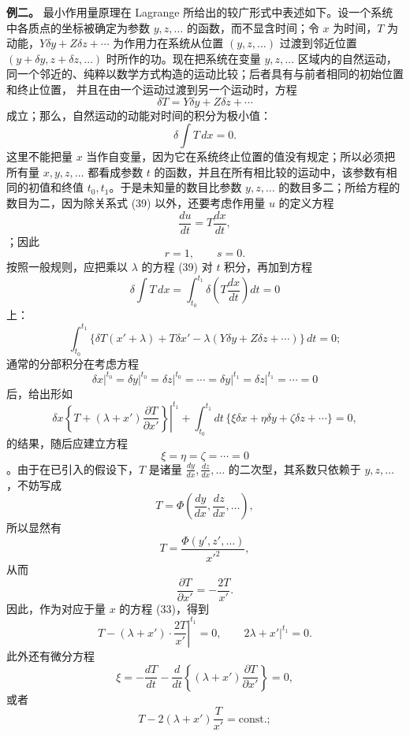 \documentclass[11pt,a4paper,leqno]{article}
\begin{document}
\noindent\textbf{例二。} 最小作用量原理在 Lagrange 所给出的较广形式中表述如下。设一个系统中各质点的坐标被确定为参数 $y,z,\ldots$ 的函数，而不显含时间；令 $x$ 为时间，$T$ 为动能，$Y\delta y+Z\delta z+\cdots$ 为作用力在系统从位置 $(y,z,\ldots)$ 过渡到邻近位置 $(y+\delta y,z+\delta z,\ldots)$ 时所作的功。现在把系统在变量 $y,z,\ldots$ 区域内的自然运动，同一个邻近的、纯粹以数学方式构造的运动比较；后者具有与前者相同的初始位置和终止位置，
并且在由一个运动过渡到另一个运动时，方程
\begin{equation}\tag{39}
\delta T=Y\delta y+Z\delta z+\cdots
\end{equation}
成立；那么，自然运动的动能对时间的积分为极小值：
\[
\delta\int T\,dx=0.
\]
这里不能把量 $x$ 当作自变量，因为它在系统终止位置的值没有规定；所以必须把所有量 $x,y,z,\ldots$ 都看成参数 $t$ 的函数，并且在所有相比较的运动中，该参数有相同的初值和终值 $t_0,t_1$。于是未知量的数目比参数 $y,z,\ldots$ 的数目多二；所给方程的数目为二，因为除关系式 (39) 以外，还要考虑作用量 $u$ 的定义方程
\[
\frac{du}{dt}=T\frac{dx}{dt},
\]
；因此
\[
r=1,\qquad s=0.
\]
按照一般规则，应把乘以 $\lambda$ 的方程 (39) 对 $t$ 积分，再加到方程
\[
\delta\int T\,dx=\int_{t_0}^{t_1}\delta\left(T\frac{dx}{dt}\right)dt=0
\]
上：
\[
\int_{t_0}^{t_1}\{\delta T(x'+\lambda)+T\delta x'
-\lambda(Y\delta y+Z\delta z+\cdots)\}\,dt=0;
\]
通常的分部积分在考虑方程
\[
\left.\delta x\right|^{t_0}=\left.\delta y\right|^{t_0}
=\left.\delta z\right|^{t_0}=\cdots
=\left.\delta y\right|^{t_1}=\left.\delta z\right|^{t_1}=\cdots=0
\]
后，给出形如
\[
\left.\delta x\left\{T+(\lambda+x')\frac{\partial T}{\partial x'}\right\}\right|^{t_1}
+\int_{t_0}^{t_1}dt\,\{\xi\delta x+\eta\delta y+\zeta\delta z+\cdots\}=0,
\]
的结果，随后应建立方程
\[
\xi=\eta=\zeta=\cdots=0
\]
。由于在已引入的假设下，$T$ 是诸量 $\frac{dy}{dx},\frac{dz}{dx},\ldots$ 的二次型，其系数只依赖于 $y,z,\ldots$，不妨写成
\[
T=\Phi\left(\frac{dy}{dx},\frac{dz}{dx},\ldots\right),
\]
所以显然有
\begin{equation}\tag{40}
T=\frac{\Phi(y',z',\ldots)}{x'^2},
\end{equation}
从而
\[
\frac{\partial T}{\partial x'}=-\frac{2T}{x'}.
\]
因此，作为对应于量 $x$ 的方程 (33)，得到
\begin{equation}\tag{41}
\left.T-(\lambda+x')\cdot\frac{2T}{x'}\right|^{t_1}=0,\qquad
\left.2\lambda+x'\right|^{t_1}=0.
\end{equation}
此外还有微分方程
\[
\xi=-\frac{dT}{dt}-\frac{d}{dt}\left\{(\lambda+x')\frac{\partial T}{\partial x'}\right\}=0,
\]
或者
\[
T-2(\lambda+x')\frac{T}{x'}=\mathrm{const.};
\]
\end{document}
